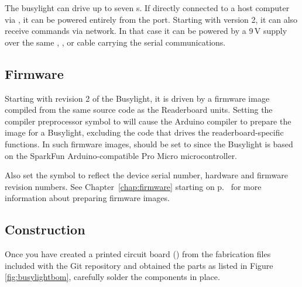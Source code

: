 The busylight can drive up to seven \led s. If directly connected to a host computer
via , it can be powered entirely from the  port. Starting with version 2,
it can also receive commands via  network. In that case it can be powered by a 9\,V
supply over the same , , or  cable carrying the serial
communications.

\subsection{Firmware}
Starting with revision 2 of the Busylight, it is driven by a firmware image compiled from the same
source code as the Readerboard units. Setting the compiler preprocessor symbol
 to  will cause the Arduino compiler to prepare the image
for a Busylight, excluding the code that drives the readerboard-specific functions.
In such firmware images,  should be set to  since the Busylight is
based on the SparkFun Arduino-compatible Pro Micro microcontroller.

Also set the  symbol to reflect the device serial number, hardware and firmware
revision numbers. See Chapter~\ref{chap:firmware} starting on p.~\pageref{chap:firmware} for more information
about preparing firmware images.

\subsection{Construction}
Once you have created a printed circuit board () from the fabrication
files included with the Git repository and obtained the parts
as listed in Figure \ref{fig:busylightbom}, carefully solder the components in place.

